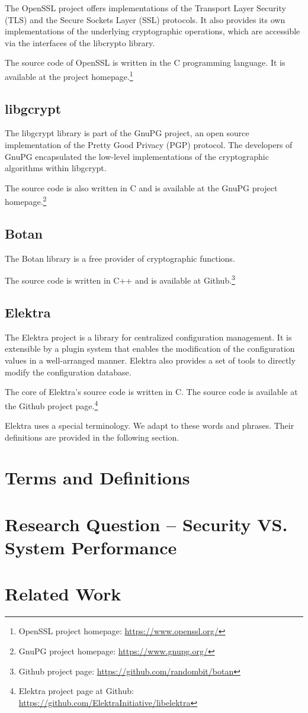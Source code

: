The OpenSSL project offers implementations of the Transport Layer Security (TLS) and the Secure Sockets Layer (SSL) protocols.
It also provides its own implementations of the underlying cryptographic operations, which are accessible via the interfaces of the libcrypto library.

The source code of OpenSSL is written in the C programming language.
It is available at the project homepage.\footnote{OpenSSL project homepage: \url{https://www.openssl.org/}}

	\subsection{libgcrypt}

The libgcrypt library is part of the GnuPG project, an open source implementation of the Pretty Good Privacy (PGP) protocol.
The developers of GnuPG encapsulated the low-level implementations of the cryptographic algorithms within libgcrypt.

The source code is also written in C and is available at the GnuPG project homepage.\footnote{GnuPG project homepage: \url{https://www.gnupg.org/}}

	\subsection{Botan}

The Botan library is a free provider of cryptographic functions.

The source code is written in C++ and is available at Github.\footnote{Github project page: \url{https://github.com/randombit/botan}}

	\subsection{Elektra}

The Elektra project is a library for centralized configuration management.
It is extensible by a plugin system that enables the modification of the configuration values in a well-arranged manner.
Elektra also provides a set of tools to directly modify the configuration database.

The core of Elektra's source code is written in C.
The source code is available at the Github project page.\footnote{Elektra project page at Github: \url{https://github.com/ElektraInitiative/libelektra}}

Elektra uses a special terminology.
We adapt to these words and phrases.
Their definitions are provided in the following section.

\section{Terms and Definitions}

\section{Research Question -- Security VS. System Performance}

\section{Related Work}
